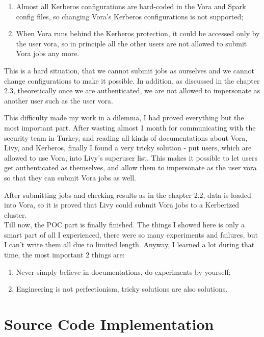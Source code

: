 \documentclass[article,colorback,accentcolor=tud4c]{tudreport}
\begin{document}
	\begin{enumerate}
		\item Almost all Kerberos configurations are hard-coded in the Vora and Spark config files, so changing Vora's Kerberos configurations is not supported;
		\item When Vora runs behind the Kerberos protection, it could be accessed only by the user vora, so in principle all the other users are not allowed to submit Vora jobs any more.
	\end{enumerate}
	
	This is a hard situation, that we cannot submit jobs as ourselves and we cannot change configurations to make it possible. In addition, as discussed in the chapter 2.3, theoretically once we are authenticated, we are not allowed to impersonate as another user such as the user vora.
	
	This difficulty made my work in a dilemma, I had proved everything but the most important part. After wasting almost 1 month for communicating with the security team in Turkey, and reading all kinds of documentations about Vora, Livy, and Kerberos, finally I found a very tricky solution - put users, which are allowed to use Vora, into Livy's superuser list. This makes it possible to let users get authenticated as themselves, and allow them to impersonate as the user vora so that they can submit Vora jobs as well.
	
	After submitting jobs and checking results as in the chapter 2.2, data is loaded into Vora, so it is proved that Livy could submit Vora jobs to a Kerberized cluster.\\
	
	Till now, the POC part is finally finished. The things I showed here is only a smart part of all I experienced, there were so many experiments and failures, but I can't write them all due to limited length. Anyway, I learned a lot during that time, the most important 2 things are:
	
	\begin{enumerate}
		\item Never simply believe in documentations, do experiments by yourself;
		\item Engineering is not perfectionism, tricky solutions are also solutions.
	\end{enumerate}
	
\newpage

\section{Source Code Implementation}
\setcounter{table}{0}
\setcounter{figure}{0}
\end{document}
